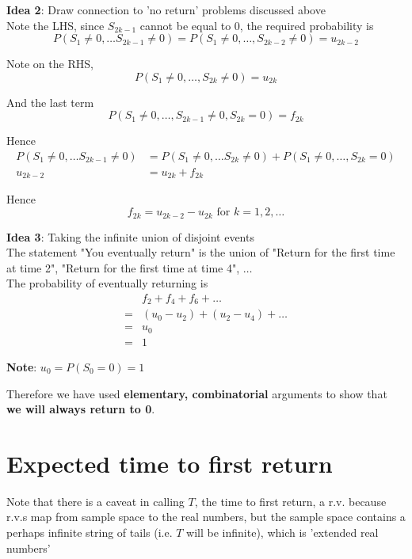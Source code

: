 \textbf{Idea 2}: Draw connection to 'no return' problems discussed above \\

Note the LHS, since $S_{2k -1}$ cannot be equal to 0, the required probability is 
\[
  P \left( S_1 \neq 0, \hdots S_{2k -1} \neq 0 \right)  = P \left( S_1 \neq 0, \hdots, S_{2k - 2} \neq 0 \right)   = u_{2k - 2}
\]

Note on the RHS, 
\[
  P \left( S_1 \neq 0, \hdots, S_{2k} \neq 0 \right)  = u_{2k}
\]

And the last term 
\[
  P \left( S_1 \neq 0, \hdots, S_{2k -1}  \neq 0, S_{2k} = 0\right) = f_{2k}
\]

Hence
\begin{align*}
  P(S_1 \neq 0, \hdots S_{2k -1} \neq 0) &= P\left( S_1 \neq 0, \hdots S_{2k} \neq 0\right) + P\left( S_1 \neq 0, \hdots, S_{2k} = 0 \right) \\
  u_{2k - 2} &= u_{2k} + f_{2k}
\end{align*}

Hence
\[
  f_{2k} = u_{2k - 2} - u_{2k} \text{ for } k = 1, 2, \hdots 
\]

\textbf{Idea 3}: Taking the infinite union of disjoint events \\

The statement "You eventually return" is the union of "Return for the first time at time 2", "Return for the first time at time 4", $\hdots$ \\

The probability of eventually returning is
\begin{align*}
  &f_2 + f_4 + f_6 + \hdots \\
  =& (u_0 - u_2) + (u_2 - u_4) + \hdots \\
  =& u_0  \\
  =& 1
\end{align*}

\textbf{Note}: $u_0 = P(S_0 = 0) = 1$

\begin{framed}
  Therefore we have used \textbf{elementary, combinatorial} arguments to show that \textbf{we will always return to 0}.
\end{framed}

\section{Expected time to first return}

Note that there is a caveat in calling $T$, the time to first return, a r.v. because r.v.s map from sample space to the real numbers, but the sample space contains a perhaps infinite string of tails (i.e. $T$ will be infinite), which is 'extended real numbers' \\

